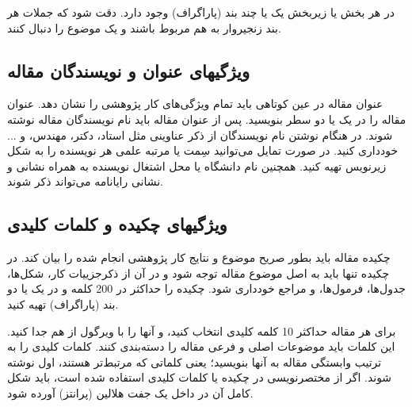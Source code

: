 \documentclass{CCI2020}
\begin{document}
در هر بخش یا زیربخش یک یا چند بند (پاراگراف) وجود دارد. دقت شود که جملات هر بند زنجیروار به هم مربوط باشند و یک موضوع را دنبال کنند. 

\subsection{ویژگی­های عنوان و نویسندگان مقاله}
عنوان مقاله در عین کوتاهی باید تمام ویژگی‌های کار پژوهشی را نشان دهد. عنوان مقاله را در یک یا دو سطر  بنویسید. 
پس از عنوان مقاله باید نام نویسندگان مقاله نوشته شوند. در هنگام نوشتن نام نویسندگان از ذکر عناوینی مثل استاد، دکتر، مهندس، و ... خودداری کنید. در صورت تمایل می‌توانید سِمت یا مرتبه علمی هر نویسنده را به شکل زیرنویس تهیه کنید. همچنین نام دانشگاه یا محل اشتغال نویسنده به همراه نشانی و نشانی رایانامه می‌تواند ذکر شوند. 

\subsection{ویژگی­های چکیده و کلمات کلیدی}
چکیده مقاله باید بطور صریح موضوع و نتایج کار پژوهشی انجام شده را بیان کند. در چکیده تنها باید به اصل موضوع مقاله توجه شود و در آن از ذکرجزییات کار، شکل‌ها، جدول‌ها، فرمول‌ها، و مراجع خودداری شود. چکیده را حداکثر در 200 کلمه و در یک یا دو بند (پاراگراف) تهیه کنید. 

برای هر مقاله حداکثر 10 کلمه کلیدی انتخاب کنید، و آنها را با ویرگول از هم جدا کنید. این کلمات باید موضوعات اصلی و فرعی مقاله را دسته‌بندی کنند. کلمات کلیدی را به ترتیب وابستگی مقاله به آنها بنویسید؛ یعنی کلماتی که مرتبط‌تر هستند، اول نوشته شوند. اگر از مختصر‌نویسی در چکیده یا کلمات کلیدی استفاده شده است، باید شکل کامل آن در داخل یک جفت هلالین (پرانتز) آورده شود.
\end{document}
